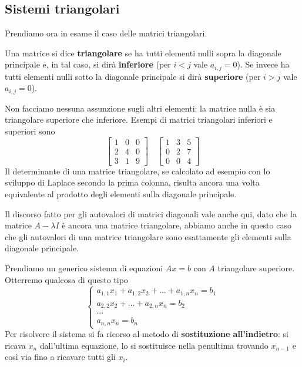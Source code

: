 \subsection{Sistemi triangolari}
Prendiamo ora in esame il caso delle matrici triangolari.

\begin{definition}
	Una matrice si dice \textbf{triangolare} se ha tutti elementi nulli sopra la diagonale principale e, in
	tal caso, si dirà \textbf{inferiore} (per $i < j$ vale $a_{i,j} = 0$). Se invece ha tutti elementi nulli
	sotto la diagonale principale si dirà \textbf{superiore} (per $i > j$ vale $a_{i,j} = 0$).
\end{definition}

Non facciamo nessuna assunzione sugli altri elementi: la matrice nulla è sia triangolare superiore che inferiore.
Esempi di matrici triangolari inferiori e superiori sono
\[
	\begin{bmatrix}
		1 & 0 & 0 \\
		2 & 4 & 0 \\
		3 & 1 & 9
	\end{bmatrix} \quad
	\begin{bmatrix}
		1 & 3 & 5 \\
		0 & 2 & 7 \\
		0 & 0 & 4
	\end{bmatrix}
\]
Il determinante di una matrice triangolare, se calcolato ad esempio con lo sviluppo di Laplace secondo la prima
colonna, risulta ancora una volta equivalente al prodotto degli elementi sulla diagonale principale.

Il discorso fatto per gli autovalori di matrici diagonali vale anche qui, dato che la matrice $A - \lambda I$ è
ancora una matrice triangolare, abbiamo anche in questo caso che gli autovalori di una matrice triangolare sono
esattamente gli elementi sulla diagonale principale.

Prendiamo un generico sistema di equazioni $A x = b$ con $A$ triangolare superiore. Otterremo qualcosa di questo
tipo
\[
	\begin{cases}
		a_{1,1} x_1 + a_{1,2} x_2 + \dots + a_{1,n} x_n = b_1 \\
		a_{2,2} x_2 + \dots + a_{2,n} x_n = b_2               \\
		\dots                                                 \\
		a_{n,n} x_n = b_n
	\end{cases}
\]
Per risolvere il sistema si fa ricorso al metodo di \textbf{sostituzione all'indietro}: si ricava $x_n$
dall'ultima equazione, lo si sostituisce nella penultima trovando $x_{n-1}$ e così via fino a ricavare tutti gli
$x_i$.

